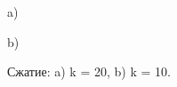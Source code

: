 \documentclass[a5paper, 10pt]{article}
\theoremstyle{definition}
\theoremstyle{plain}
\theoremstyle{remark}
\begin{document}
\begin{figure}[h]
\begin{minipage}[h]{1\linewidth}
 a) \\
\end{minipage}
\begin{minipage}[h]{1\linewidth}
 b) \\
\end{minipage}
\caption{Сжатие: a) k = 20, b) k = 10.}
\end{figure}
\end{document}
